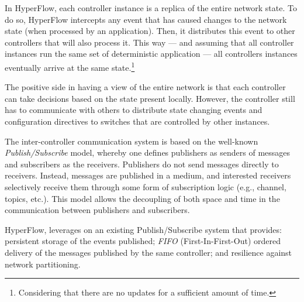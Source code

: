 In HyperFlow, each controller instance is a replica of the entire network state. 
To do so, HyperFlow intercepts any event that has caused changes to the network state (when processed by an application). 
Then, it distributes this event to other controllers that  will also process it. 
This way  --- and assuming that all controller instances run the same set of deterministic application --- all controllers instances eventually arrive at the same state.\footnote{Considering that there are no updates for a sufficient amount of time.}

The positive side in having a view of the entire network is that each controller can take decisions based on the state present locally.
However, the controller still has to communicate with others to distribute state changing events and configuration directives to switches that are controlled by other instances. 


The inter-controller communication system is based on the well-known \emph{Publish/Subscribe} model, whereby one defines publishers as senders of messages and subscribers as the receivers. 
Publishers do not send messages directly  to receivers.  
Instead, messages are published in a medium, and interested receivers selectively receive them through some form of subscription logic (e.g., channel, topics, etc.). 
This model allows the decoupling of both space and time in the communication between publishers and subscribers. 

HyperFlow, leverages on an existing Publish/Subscribe system that provides: persistent storage of the events published; \emph{FIFO}
(First-In-First-Out)  ordered delivery of the messages published by the same controller; and resilience against network partitioning.



